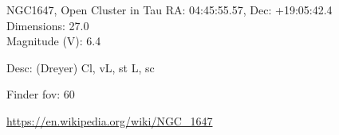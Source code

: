 \begin{block}{NGC1647, Open Cluster in Tau}
    RA: 04:45:55.57, Dec: +19:05:42.4 \\ 
    Dimensions: 27.0 \\ 
    Magnitude (V): 6.4


    Desc: (Dreyer) Cl, vL, st L, sc 

    Finder fov: 60 

    \url{https://en.wikipedia.org/wiki/NGC_1647} 
\end{block}